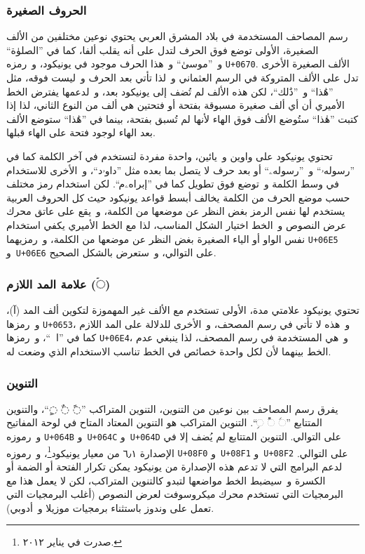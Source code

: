 \documentclass[a4paper]{article}
\renewcommand\U[1]{\colorbox{codecolor}{\texttt{U+#1}}}
\begin{document}
\subsubsection{الحروف الصغيرة}
\begin{description}[style=nextline]
\item[الألف الصغيرة (◌ٰ)]
	رسم المصاحف المستخدمة في بلاد المشرق العربي يحتوي نوعين مختلفين من
	الألف الصغيرة، الأولى توضع فوق الحرف لتدل على أنه يقلب ألفا، كما في
	”الصلوٰة“ و ”موسىٰ“ و هذا الحرف موجود في يونيكود، و رمزه
	\U{0670}. الألف الصغيرة الأخرى تدل على الألف المتروكة في
	الرسم العثماني و لذا تأتي بعد الحرف و ليست فوقه، مثل ”هَٰذا“ و ”ذَٰلك“،
	لكن هذه الألف لم تُضف إلى يونيكود بعد، و لدعمها يفترض الخط الأميري أن
	أي ألف صغيرة مسبوقة بفتحة أو فتحتين هي ألف من النوع الثاني، لذا إذا
	كتبت ”هٰذا“ ستُوضع الألف فوق الهاء لأنها لم تُسبق بفتحة، بينما في ”هَٰذا“
	ستوضع الألف بعد الهاء لوجود فتحة على الهاء قبلها.

\item[الواو (ۥ) و الياء (ۦ) الصغيرتين]
	تحتوي يونيكود على واوين و يائين، واحدة مفردة لتستخدم في آخر الكلمة
	كما في ”رسولهۥ“ و ”رسولهۦ“ أو بعد حرف لا يتصل بما بعده مثل ”داوۥد“،
	و الأخرى للاستخدام في وسط الكلمة و توضع فوق تطويل كما في ”إبراهۦم“.
	لكن استخدام رمز مختلف حسب موضع الحرف من الكلمة يخالف أبسط قواعد
	يونيكود حيث كل الحروف العربية يستخدم لها نفس الرمز بغض النظر عن
	موضعها من الكلمة، و يقع على عاتق محرك عرض النصوص و الخط اختيار الشكل
	المناسب، لذا مع الخط الأميري يكفي استخدام نفس الواو أو الياء الصغيرة
	بغض النظر عن موضعها من الكلمة، و رمزيهما \U{06E5}
	و \U{06E6} على التوالي، و ستعرض بالشكل الصحيح.
\end{description}

\subsubsection{علامة المد اللازم (\textup{◌ۤ})}
تحتوي يونيكود علامتي مدة، الأولى تستخدم مع الألف غير المهموزة لتكوين ألف
المد (آ)، و رمزها \U{0653}، و هذه لا تأتي في رسم المصحف، و الأخرى
للدلالة على المد اللازم كما في ”الۤمۤ“، و رمزها \U{06E4}، و هي
المستخدمة في رسم المصحف، لذا ينبغي عدم الخط بينهما لأن لكل واحدة خصائص
في الخط تناسب الاستخدام الذي وضعت له.

\subsubsection{التنوين}
يفرق رسم المصاحف بين نوعين من التنوين، التنوين المتراكب ”◌ً ◌ٌ ◌ٍ“،
والتنوين المتتابع ”◌ࣰ ◌ࣱ ◌ࣲ“. التنوين المتراكب هو التنوين المعتاد المتاح
في لوحة المفاتيح و رموزه \U{064B} و \U{064C}
و \U{064D} على التوالي. التنوين المتتابع لم يُضف إلا في الإصدارة
٦٫١ من معيار يونيكود\footnote{صدرت في يناير ٢٠١٢.}، و رموزه
\U{08F0} و \U{08F1} و \U{08F2} على التوالي. لدعم
البرامج التي لا تدعم هذه الإصدارة من يونيكود يمكن تكرار الفتحة أو الضمة
أو الكسرة و سيضبط الخط مواضعها لتبدو كالتنوين المتراكب، لكن لا يعمل هذا
مع البرمجيات التي تستخدم محرك ميكروسوفت لعرض النصوص (أغلب البرمجيات التي
تعمل على وندوز باستثناء برمجيات موزيلا و أدوبي).
\end{document}
